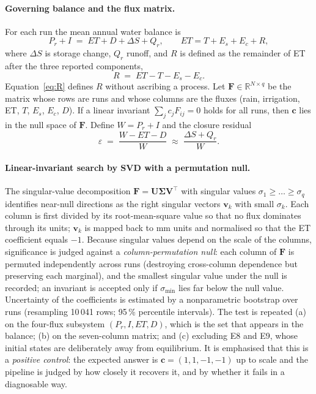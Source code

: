\paragraph{Governing balance and the flux matrix.}
For each run the mean annual water balance is
\begin{equation}
P_r+I \;=\; \mathit{ET}+D+\Delta S+Q_r,\qquad \mathit{ET}=T+E_s+E_c+R,
\label{eq:wb2}
\end{equation}
where $\Delta S$ is storage change, $Q_r$ runoff, and $R$ is defined as the remainder of ET after the three reported components,
\begin{equation}
R \;=\; \mathit{ET}-T-E_s-E_c .
\label{eq:R}
\end{equation}
Equation~\eqref{eq:R} defines $R$ without ascribing a process. Let $\mathbf F\in\mathbb R^{N\times q}$ be the matrix whose rows are runs and whose columns are the fluxes (rain, irrigation, ET, $T$, $E_s$, $E_c$, $D$). If a linear invariant $\sum_j c_jF_{ij}=0$ holds for all runs, then $\mathbf c$ lies in the null space of $\mathbf F$. Define $W=P_r+I$ and the closure residual
\begin{equation}
\varepsilon \;=\; \frac{W-\mathit{ET}-D}{W}\;\approx\;\frac{\Delta S+Q_r}{W}.
\label{eq:closure}
\end{equation}

\paragraph{Linear-invariant search by SVD with a permutation null.}
The singular-value decomposition $\mathbf F=\mathbf U\boldsymbol\Sigma\mathbf V^{\top}$ with singular values $\sigma_1\ge\dots\ge\sigma_q$ identifies near-null directions as the right singular vectors $\mathbf v_k$ with small $\sigma_k$. Each column is first divided by its root-mean-square value so that no flux dominates through its units; $\mathbf v_k$ is mapped back to mm units and normalised so that the ET coefficient equals $-1$. Because singular values depend on the scale of the columns, significance is judged against a \emph{column-permutation null}: each column of $\mathbf F$ is permuted independently across runs (destroying cross-column dependence but preserving each marginal), and the smallest singular value under the null is recorded; an invariant is accepted only if $\sigma_{\min}$ lies far below the null value. Uncertainty of the coefficients is estimated by a nonparametric bootstrap over runs (resampling 10\,041 rows; 95\,\% percentile intervals). The test is repeated (a) on the four-flux subsystem $(P_r,I,\mathit{ET},D)$, which is the set that appears in the balance; (b) on the seven-column matrix; and (c) excluding E8 and E9, whose initial states are deliberately away from equilibrium. It is emphasised that this is a \emph{positive control}: the expected answer is $\mathbf c=(1,1,-1,-1)$ up to scale and the pipeline is judged by how closely it recovers it, and by whether it fails in a diagnosable way.

